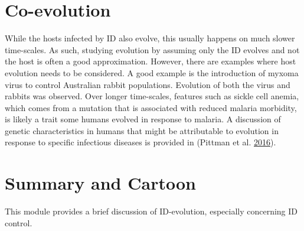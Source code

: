 \documentclass[]{book}
\theoremstyle{definition}
\theoremstyle{definition}
\theoremstyle{definition}
\theoremstyle{remark}
\begin{document}
\section{Co-evolution}\label{co-evolution}

While the hosts infected by ID also evolve, this usually happens on much
slower time-scales. As such, studying evolution by assuming only the ID
evolves and not the host is often a good approximation. However, there
are examples where host evolution needs to be considered. A good example
is the introduction of myxoma virus to control Australian rabbit
populations. Evolution of both the virus and rabbits was observed. Over
longer time-scales, features such as sickle cell anemia, which comes
from a mutation that is associated with reduced malaria morbidity, is
likely a trait some humans evolved in response to malaria. A discussion
of genetic characteristics in humans that might be attributable to
evolution in response to specific infectious diseases is provided in
(Pittman et al. \protect\hyperlink{ref-pittman16}{2016}).

\section{Summary and Cartoon}\label{summary-and-cartoon-13}

This module provides a brief discussion of ID-evolution, especially
concerning ID control.
\end{document}
